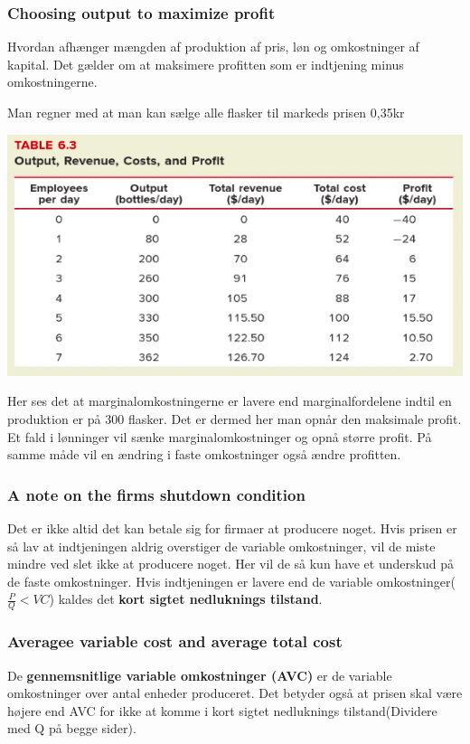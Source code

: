 \subsubsection{Choosing output to maximize profit}
Hvordan afhænger mængden af produktion af pris, løn og omkostninger af kapital. Det gælder om at maksimere profitten som er indtjening minus omkostningerne. 

\begin{eks} \textbf{} %
\newline
Man regner med at man kan sælge alle flasker til markeds prisen 0,35kr 

\includegraphics[scale=0.8]{Afsnit/Lektion2/maksprofit.png}

Her ses det at marginalomkostningerne er lavere end marginalfordelene indtil en produktion er på 300 flasker. Det er dermed her man opnår den maksimale profit. Et fald i lønninger vil sænke marginalomkostninger og opnå større profit. På samme måde vil en ændring i faste omkostninger også ændre profitten. 
\end{eks}

\subsubsection{A note on the firms shutdown condition}
Det er ikke altid det kan betale sig for firmaer at producere noget. Hvis prisen er så lav at indtjeningen aldrig overstiger de variable omkostninger, vil de miste mindre ved slet ikke at producere noget. Her vil de så kun have et underskud på de faste omkostninger. Hvis indtjeningen er lavere end de variable omkostninger($\frac{P}{Q}<VC$) kaldes det \textbf{kort sigtet nedluknings tilstand}.

\subsubsection{Averagee variable cost and average total cost}
De \textbf{gennemsnitlige variable omkostninger (AVC)} er de variable omkostninger over antal enheder produceret. Det betyder også at prisen skal være højere end AVC for ikke at komme i kort sigtet nedluknings tilstand(Dividere med Q på begge sider). 

